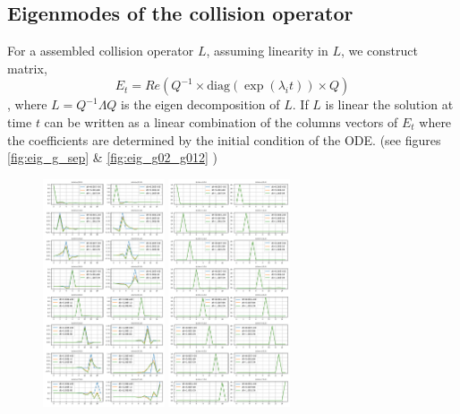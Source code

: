 \documentclass{article}
\begin{document}
\subsection{Eigenmodes of the collision operator}
For a assembled collision operator $L$, assuming linearity in $L$, we construct matrix, 
\begin{equation}
	E_t = Re\left( Q^{-1} \times  \text{diag}(\exp(\lambda_i t)) \times Q \right) 
\end{equation}, where $L=Q^{-1} \Lambda Q$ is the eigen decomposition of $L$. If $L$ is linear the solution at time $t$ can be written as a linear combination of the columns vectors of $E_t$ where the coefficients are determined by the initial condition of the ODE. (see figures \ref{fig:eig_g_sep} \& \ref{fig:eig_g02_g012}  )

\begin{figure}[!htbp]
	\includegraphics[width=0.32\textwidth]{fig/g0_Nr_7_eig_ev_1.00E+00_NI_1.00E+18_N0_3.22E+22_NE_1.00E+18.png}
	\includegraphics[width=0.32\textwidth]{fig/g1_Nr_7_eig_ev_1.00E+00_NI_1.00E+18_N0_3.22E+22_NE_1.00E+18.png}

\end{figure}
\end{document}
